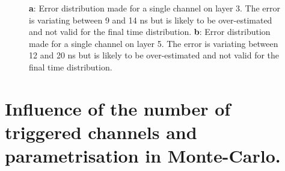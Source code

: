 \documentclass[twoside,a4paper,11pt]{article}
\begin{document}
\begin{appendix}
\begin{figure}[htbp]
	\hfill
	\caption[]{\textbf{a}: Error distribution made for a single channel on layer 3. The error is variating between 9 and 14 ns but is likely to be over-estimated and not valid for the final time distribution. \textbf{b}: Error distribution made for a single channel on layer 5. The error is variating between 12 and 20 ns but is likely to be over-estimated and not valid for the final time distribution.}
	\label{fig:error_calibration}
\end{figure}

\newpage
\section{Influence of the number of triggered channels and parametrisation in Monte-Carlo.}
\label{appendix:ped_shift}


\end{appendix}
\end{document}
